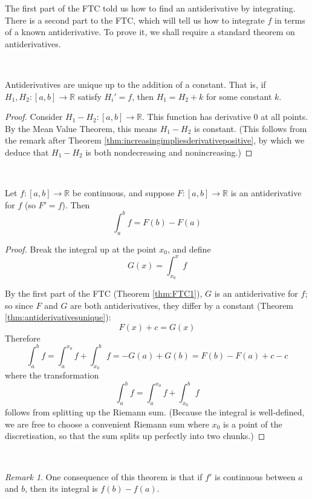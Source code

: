 \documentclass[11pt]{amsart}
\theoremstyle{remark}
\newtheorem*{remark}{Remark}
\begin{document}
The first part of the FTC told us how to find an antiderivative by integrating.
There is a second part to the FTC, which will tell us how to integrate $f$ in terms of a known antiderivative.
To prove it, we shall require a standard theorem on antiderivatives.

\

\begin{thm} \label{thm:antiderivativesunique} Antiderivatives are unique up to the addition of a constant.
That is, if $H_1, H_2: [a, b] \to \mathbb{R}$ satisfy $H_i' = f$, then $H_1 = H_2 + k$ for some constant $k$.
\end{thm}
\begin{proof}
Consider $H_1 - H_2: [a,b] \to \mathbb{R}$.
This function has derivative $0$ at all points.
By the Mean Value Theorem, this means $H_1 - H_2$ is constant.
(This follows from the remark after Theorem \ref{thm:increasingimpliesderivativepositive}, by which we deduce that $H_1 - H_2$ is both nondecreasing and nonincreasing.)
\end{proof}

\

\begin{thm} \label{thm:FTC2}
Let $f: [a,b] \to \mathbb{R}$ be continuous, and suppose $F: [a,b] \to \mathbb{R}$ is an antiderivative for $f$ (so $F' = f$).
Then
$$\int_a^b f = F(b) - F(a)$$
\end{thm}
\begin{proof}
Break the integral up at the point $x_0$, and define $$G(x) = \int_{x_0}^x f$$

By the first part of the FTC (Theorem \ref{thm:FTC1}), $G$ is an antiderivative for $f$; so since $F$ and $G$ are both antiderivatives, they differ by a constant (Theorem \ref{thm:antiderivativesunique}): $$F(x)+c = G(x)$$
Therefore $$\int_a^b f = \int_a^{x_0} f + \int_{x_0}^b f = -G(a) + G(b) = F(b)-F(a)+c-c$$
where the transformation $$\int_a^b f = \int_a^{x_0} f + \int_{x_0}^b f$$ follows from splitting up the Riemann sum.
(Because the integral is well-defined, we are free to choose a convenient Riemann sum where $x_0$ is a point of the discretisation, so that the sum splits up perfectly into two chunks.)
\end{proof}

\

\begin{remark}
One consequence of this theorem is that if $f'$ is continuous between $a$ and $b$, then its integral is $f(b) - f(a)$.
\end{remark}
\end{document}
